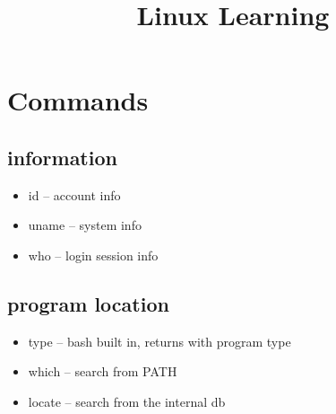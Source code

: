 \documentclass[titlepage]{article}
\begin{document}
	\title{Linux Learning}
	\maketitle
	
	\section{Commands}
	  \subsection{information}
	    \begin{itemize}
	    	\item id -- account info
	    	\item uname -- system info
	    	\item who -- login session info
	    \end{itemize}
    
      \subsection{program location}
        \begin{itemize}
        	\item type -- bash built in, returns with program type
        	\item which -- search from PATH
        	\item locate -- search from the internal db
        \end{itemize}
\end{document}

